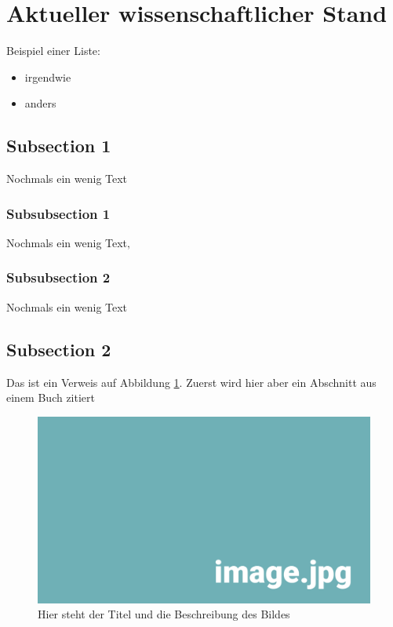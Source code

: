 
\section{Aktueller wissenschaftlicher Stand}

Beispiel einer Liste:

\begin{itemize} 
	\item irgendwie 
	\item anders
\end{itemize}


\subsection{Subsection 1}
Nochmals ein wenig Text

\subsubsection{Subsubsection 1}
Nochmals ein wenig Text‚

\subsubsection{Subsubsection 2}
Nochmals ein wenig Text

\subsection{Subsection 2}
Das ist ein Verweis auf Abbildung \ref{pic:DasBild}. Zuerst wird hier aber ein Abschnitt aus einem Buch  zitiert\\

\begin{figure}[h!]
	\centering

	\includegraphics[width=\textwidth]{img/image.jpg}

	\caption[Hier steht der Titel des Bildes]{Hier steht der Titel und die Beschreibung des Bildes}
	\label{pic:DasBild}

\end{figure}